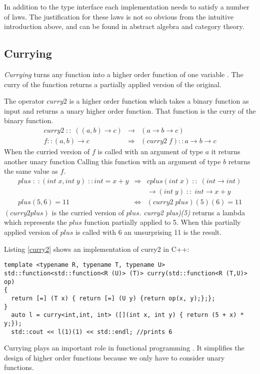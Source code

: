 \documentclass[12pt,fleqn]{article}
\begin{document}
In addition to the type interface each implementation needs to satisfy a number of laws.
The justification for these laws is not so obvious from the intuitive introduction above, and can be found in abstract algebra and category theory.

%
%
%
\subsection{Currying}
%
%
{\em Currying} turns any function into a higher order function of one variable \cite{field}.
The curry of the function returns a partially applied version of the original.

The operator $curry2$ is a higher order function which takes a binary function as input 
and returns a unary higher order function.
That function is the curry of the binary function.
\begin{eqnarray*}
curry2 \; :: \; ((a,b) \rightarrow c) &\rightarrow& (a \rightarrow b \rightarrow c) \\
f::(a,b) \rightarrow c &\Rightarrow&  (curry2\;f)::a \rightarrow b \rightarrow c 
\end{eqnarray*}
When the curried version of $f$ is called with an argument of type $a$ it returns another unary function 
Calling this function with an argument of type $b$ returns the same value as $f$.
\begin{eqnarray*}
plus\;:\;:(int \;x, int \;y) \;::int = x+y &\Rightarrow& cplus(int\; x) \;::\; (int \rightarrow int)  \\
                                                             & & \rightarrow (int \; y) \;::\; int \rightarrow x+y  \\
plus(5,6) = 11 &\Leftrightarrow&(curry2 \; plus)(5)(6) = 11
\end{eqnarray*}
$(curry2 plus)$ is the curried version of $plus$.
{\em curry2 plus)(5)} returns a lambda which represents the $plus$ function partially applied to 5. 
When this partially applied version of $plus$ is called with 6 an unsurprising 11 is the result.

Listing \ref{curry2} shows an implementation of curry2 in C++: 
\begin{lstlisting}[caption=curry for binary operators, label=curry2]
template <typename R, typename T, typename U>
std::function<std::function<R (U)> (T)> curry(std::function<R (T,U)> op)
{
  return [=] (T x) { return [=] (U y) {return op(x, y);};};
}
  auto l = curry<int,int, int> ([](int x, int y) { return (5 + x) * y;});
  std::cout << l(1)(1) << std::endl; //prints 6
\end{lstlisting}
Currying plays an important role in functional programming \cite{field}. 
It simplifies the design of higher order functions because we only have to consider unary functions.
\end{document}

